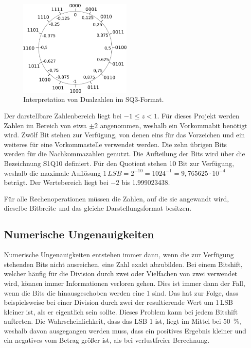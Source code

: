 \begin{figure}[ht!]
 \centering
 \includegraphics[width=0.5\textwidth]{img/SQ-Kreis.png}
 \caption{Interpretation von Dualzahlen im SQ3-Format.}
 \label{pic:SQKreis}
\end{figure}


Der darstellbare Zahlenbereich liegt bei $-1\leq z < 1$. Für dieses Projekt werden Zahlen im Bereich von etwa $\pm2$ angenommen, weshalb ein Vorkommabit benötigt wird. 
Zwölf Bit stehen zur Verfügung, von denen eins für das Vorzeichen und ein weiteres für eine Vorkommastelle verwendet werden. Die zehn übrigen Bits werden für die 
Nachkommazahlen genutzt. Die Aufteilung der Bits wird über die Bezeichnung S1Q10 definiert.
Für den Quotient stehen 10 Bit zur Verfügung, weshalb die maximale Auflösung $1\,LSB = 2^{-10} = {1024}^{-1} = 9,765625\cdot10^{-4}$ beträgt.
Der Wertebereich liegt bei \num{-2} bis \num{1,999023438}. 

Für alle Rechenoperationen müssen die Zahlen, auf die sie angewandt wird, dieselbe Bitbreite und das gleiche Darstellungsformat besitzen.

\subsection{Numerische Ungenauigkeiten}\label{sec:NumerischeUngenauigkeiten}
Numerische Ungenauigkeiten entstehen immer dann, wenn die zur Verfügung stehenden Bits nicht ausreichen, eine Zahl exakt abzubilden. 
Bei einem Bitshift, welcher häufig für die Division durch zwei oder Vielfachen von zwei verwendet wird, können immer Informationen verloren gehen. Dies ist immer dann der Fall,
wenn die Bits die hinausgeschoben werden eine 1 sind. Das hat zur Folge, dass beispielsweise
bei einer Division durch zwei der resultierende Wert um 1\,LSB kleiner ist, als er eigentlich sein sollte. 
Dieses Problem kann bei jedem Bitshift auftreten. Die Wahrscheinlichkeit, dass das LSB 1 ist, liegt im Mittel bei \SI{50}{\percent}, weshalb davon ausgegangen werden muss, dass ein 
positives Ergebnis kleiner und ein negatives vom Betrag größer ist, als bei verlustfreier Berechnung. 
